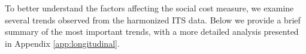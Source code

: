 To better understand the factors affecting the social cost measure, we examine several trends observed from the harmonized ITS data. Below we provide a brief summary of the most important trends, with a more detailed analysis presented in Appendix \ref{app:longitudinal}. 
%
%
%
    


